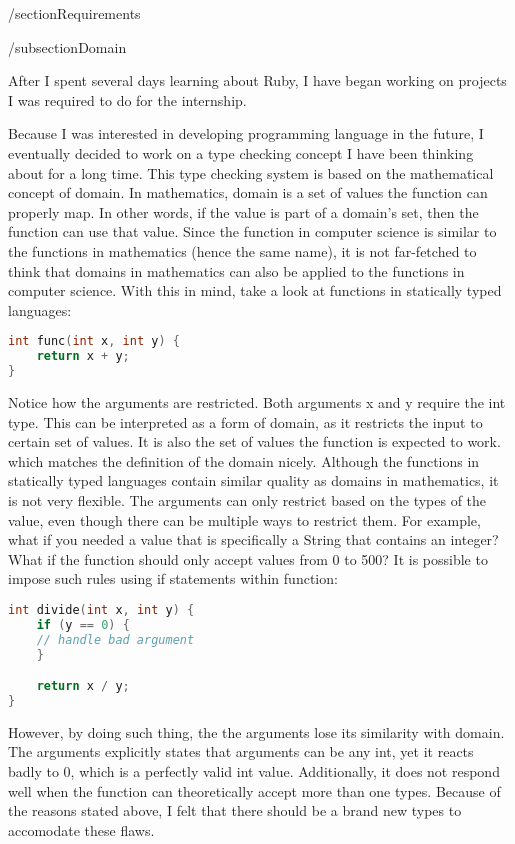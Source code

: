 /section{Requirements}

/subsection{Domain}

After I spent several days learning about Ruby, I have began working on projects I was required to do for the internship.

Because I was interested in developing programming language in the future, I eventually decided to work on a type checking concept I have been thinking about for a long time.  This type checking system is based on the mathematical concept of domain.  In mathematics, domain is a set of values the function can properly map.  In other words, if the value is part of a domain's set, then the function can use that value.  Since the function in computer science is similar to the functions in mathematics (hence the same name), it is not far-fetched to think that domains in mathematics can also be applied to the functions in computer science.  With this in mind, take a look at functions in statically typed languages:

\begin{lstlisting}[language=C++, caption={Domain example}]
int func(int x, int y) {
    return x + y;
}
\end{lstlisting}

Notice how the arguments are restricted.  Both arguments x and y require the int type.  This can be interpreted as a form of domain, as it restricts the input to certain set of values.  It is also the set of values the function is expected to work. which matches the definition of the domain nicely.  Although the functions in statically typed languages contain similar quality as domains in mathematics, it is not very flexible.  The arguments can only restrict based on the types of the value, even though there can be multiple ways to restrict them.  For example, what if you needed a value that is specifically a String that contains an integer?  What if the function should only accept values from 0 to 500?  It is possible to impose such rules using if statements within function:

\begin{lstlisting}[language=C++, caption={Domain example}]
int divide(int x, int y) {
    if (y == 0) {
	// handle bad argument
    }

    return x / y;
}
\end{lstlisting}

However, by doing such thing, the the arguments lose its similarity with domain.  The arguments explicitly states that arguments can be any int, yet it reacts badly to 0, which is a perfectly valid int value.  Additionally, it does not respond well when the function can theoretically accept more than one types.  Because of the reasons stated above, I felt that there should be a brand new types to accomodate these flaws.
